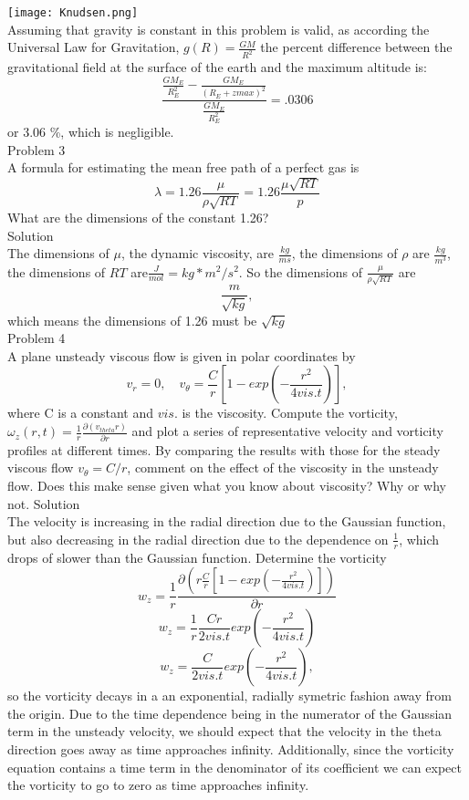 \documentclass{article}
\begin{document}
\texttt{[image: Knudsen.png]}
\\
Assuming that gravity is constant in this problem is valid, as according the Universal Law for Gravitation, $g(R) = \frac{GM}{R^2}$ the percent difference between the gravitational field at the surface of the earth and the maximum altitude is:
$$
\frac{\frac{GM_{E}}{R_{E}^2} - \frac{GM_E}{(R_E +zmax)^2}}{\frac{GM_{E}}{R_E^2}}
=.0306
$$ 
or 3.06 \%, which is negligible.\\
$$
$$
Problem 3\\
A formula for estimating the mean free path of a perfect gas is
$$
\lambda = 1.26 \frac{\mu}{\rho\sqrt{RT}} =  1.26 \frac{\mu\sqrt{RT}}{p}$$ 
What are the dimensions of the constant 1.26?\\
$$
$$
Solution\\
The dimensions of $\mu$, the dynamic viscosity, are $\frac{kg}{ms}$, the dimensions of $\rho$ are $\frac{kg}{m^3}$, the dimensions of $RT$ are$\frac{J}{mol} = kg*m^2/s^2$. So the dimensions of $\frac{\mu}{\rho\sqrt{RT}}$ are
$$
\frac{m}{\sqrt{kg}},
$$
which means the dimensions of 1.26 must be $\sqrt{kg}$
$$
$$
Problem 4\\
A plane unsteady viscous flow is given in polar coordinates by
$$
v_{r} = 0, \quad v_{\theta} = \frac{C}{r}[1-exp(-\frac{r^2}{4vis. t})],
$$
where C is a constant and $vis.$ is the viscosity. Compute the vorticity, $\omega_{z}(r,t) = \frac{1}{r}\frac{\partial(v_{theta}r)}{\partial r}$ and plot a series of representative velocity and vorticity profiles at different times. By comparing
the results with those for the steady viscous flow $v_θ = C/r$, comment on the effect of the viscosity in the unsteady flow. Does this make sense given what you know about viscosity? Why or why not.
Solution\\
The velocity is increasing in the radial direction due to the Gaussian function, but also decreasing in the radial direction due to the dependence on $\frac{1}{r}$, which drops of slower than the Gaussian function.
Determine the vorticity
\[
w_z = \frac{1}{r}\frac{\partial(r\frac{C}{r}[1-exp(-\frac{r^2}{4vis. t})])}{\partial r}\]
\[
w_z = \frac{1}{r}\frac{C r}{2vis. t}exp(-\frac{r^2}{4vis. t})\]
\[
w_z = \frac{C}{2vis. t}exp(-\frac{r^2}{4vis. t}),
\]
so the vorticity decays in a an exponential, radially symetric fashion away from the origin. Due to the time dependence being in the numerator of the Gaussian term in the unsteady velocity, we should expect that the velocity in the theta direction goes away as time approaches infinity. Additionally, since the vorticity equation contains a time term in the denominator of its coefficient we can expect the vorticity to go to zero as time approaches infinity.\\
\end{document}
